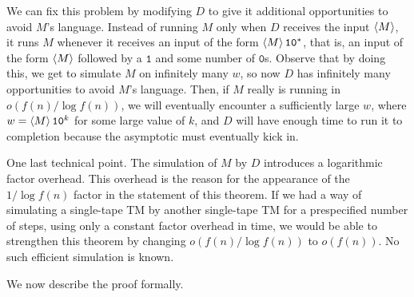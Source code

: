 \begin{proofidea}
  We can fix this problem by modifying $D$ to give it additional opportunities to avoid $M$'s language. Instead of running $M$ only when $D$ receives the input $\left< M \right>$, it runs $M$ whenever it receives an input of the form $\left< M \right>\texttt{1}\texttt{0}^\ast$, that is, an input of the form $\left< M \right>$ followed by a $\texttt{1}$ and some number of $\texttt{0}$s. Observe that by doing this, we get to simulate $M$ on infinitely many $w$, so now $D$ has infinitely many opportunities to avoid $M$'s language. Then, if $M$ really is running in $o(f(n) / \log f(n))$, we will eventually encounter a sufficiently large $w$, where $w = \left< M \right>\texttt{1}\texttt{0}^k$ for some large value of $k$, and $D$ will have enough time to run it to completion because the asymptotic must eventually kick in.

  One last technical point. The simulation of $M$ by $D$ introduces a logarithmic factor overhead. This overhead is the reason for the appearance of the $1 / \log f(n)$ factor in the statement of this theorem. If we had a way of simulating a single-tape TM by another single-tape TM for a prespecified number of steps, using only a constant factor overhead in time, we would be able to strengthen this theorem by changing $o(f(n) / \log f(n))$ to $o(f(n))$. No such efficient simulation is known.
\end{proofidea}

We now describe the proof formally.


